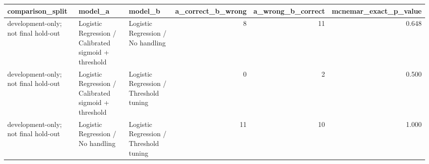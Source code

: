 \begin{tabular}{lllrrr}
\toprule
comparison_split & model_a & model_b & a_correct_b_wrong & a_wrong_b_correct & mcnemar_exact_p_value \\
\midrule
development-only; not final hold-out & Logistic Regression / Calibrated sigmoid + threshold & Logistic Regression / No handling & 8 & 11 & 0.648 \\
development-only; not final hold-out & Logistic Regression / Calibrated sigmoid + threshold & Logistic Regression / Threshold tuning & 0 & 2 & 0.500 \\
development-only; not final hold-out & Logistic Regression / No handling & Logistic Regression / Threshold tuning & 11 & 10 & 1.000 \\
\bottomrule
\end{tabular}
